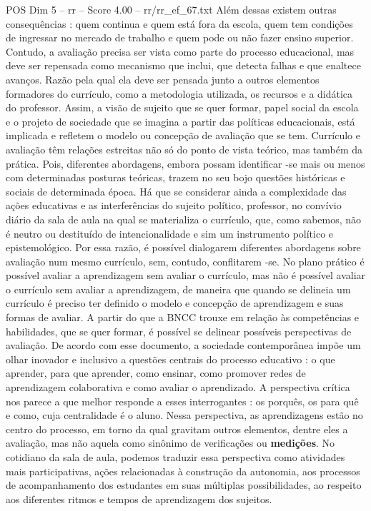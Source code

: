 \begin{textsample}{POS Dim 5 – rr – Score 4.00 – rr/rr\_ef\_67.txt}
Além dessas existem outras consequências : quem continua e quem está fora da escola, quem tem condições de ingressar no mercado de trabalho e quem pode ou não fazer ensino superior.
Contudo, a avaliação precisa ser vista como parte do processo educacional, mas deve ser repensada como mecanismo que inclui, que detecta falhas e que enaltece avanços.
Razão pela qual ela deve ser pensada junto a outros elementos formadores do currículo, como a metodologia utilizada, os recursos e a didática do professor.
Assim, a visão de sujeito que se quer formar, papel social da escola e o projeto de sociedade que se imagina a partir das políticas educacionais, está implicada e refletem o modelo ou concepção de avaliação que se tem.
Currículo e avaliação têm relações estreitas não só do ponto de vista teórico, mas também da prática.
Pois, diferentes abordagens, embora possam identificar -se mais ou menos com determinadas posturas teóricas, trazem no seu bojo questões históricas e sociais de determinada época.
Há que se considerar ainda a complexidade das ações educativas e as interferências do sujeito político, professor, no convívio diário da sala de aula na qual se materializa o currículo, que, como sabemos, não é neutro ou destituído de intencionalidade e sim um instrumento político e epistemológico.
Por essa razão, é possível dialogarem diferentes abordagens sobre avaliação num mesmo currículo, sem, contudo, conflitarem -se.
No plano prático é possível avaliar a aprendizagem sem avaliar o currículo, mas não é possível avaliar o currículo sem avaliar a aprendizagem, de maneira que quando se delineia um currículo é preciso ter definido o modelo e concepção de aprendizagem e suas formas de avaliar.
A partir do que a BNCC trouxe em relação às competências e habilidades, que se quer formar, é possível se delinear possíveis perspectivas de avaliação.
De acordo com esse documento, a sociedade contemporânea impõe um olhar inovador e inclusivo a questões centrais do processo educativo : o que aprender, para que aprender, como ensinar, como promover redes de aprendizagem colaborativa e como avaliar o aprendizado.
A perspectiva crítica nos parece a que melhor responde a esses interrogantes : os porquês, os para quê e como, cuja centralidade é o aluno.
Nessa perspectiva, as aprendizagens estão no centro do processo, em torno da qual gravitam outros elementos, dentre eles a avaliação, mas não aquela como sinônimo de verificações ou \textbf{medições}.
No cotidiano da sala de aula, podemos traduzir essa perspectiva como atividades mais participativas, ações relacionadas à construção da autonomia, aos processos de acompanhamento dos estudantes em suas múltiplas possibilidades, ao respeito aos diferentes ritmos e tempos de aprendizagem dos sujeitos.

\end{textsample}
